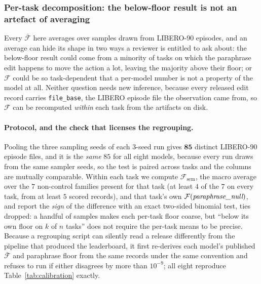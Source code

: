 \subsubsection{Per-task decomposition: the below-floor result is not an artefact of averaging}
\label{sec:per_task}

Every $\bar{\mathcal{F}}$ here averages over samples drawn from LIBERO-90 episodes, and an average can hide its shape in two ways a reviewer is entitled to ask about: the below-floor result could come from a minority of tasks on which the paraphrase edit happens to move the action a lot, leaving the majority above their floor; or $\mathcal{F}$ could be so task-dependent that a per-model number is not a property of the model at all. Neither question needs new inference, because every released edit record carries \texttt{file\_base}, the LIBERO episode file the observation came from, so $\mathcal{F}$ can be recomputed \emph{within} each task from the artifacts on disk.

\paragraph{Protocol, and the check that licenses the regrouping.} Pooling the three sampling seeds of each 3-seed run gives $\mathbf{85}$ distinct LIBERO-90 episode files, and it is the \emph{same} $85$ for all eight models, because every run draws from the same sampler seeds, so the test is paired across tasks and the columns are mutually comparable. Within each task we compute $\mathcal{F}_{\text{sem}}$, the macro average over the $7$ non-control families present for that task (at least $4$ of the $7$ on every task, from at least $5$ scored records), and that task's own $\mathcal{F}(\emph{paraphrase\_null})$, and report the \emph{sign} of the difference with an exact two-sided binomial test, ties dropped: a handful of samples makes each per-task floor coarse, but ``below its own floor on $k$ of $n$ tasks'' does not require the per-task means to be precise. Because a regrouping script can silently read a release differently from the pipeline that produced the leaderboard, it first re-derives each model's published $\bar{\mathcal{F}}$ and paraphrase floor from the same records under the same convention and refuses to run if either disagrees by more than $10^{-9}$; all eight reproduce Table~\ref{tab:calibration} exactly.

